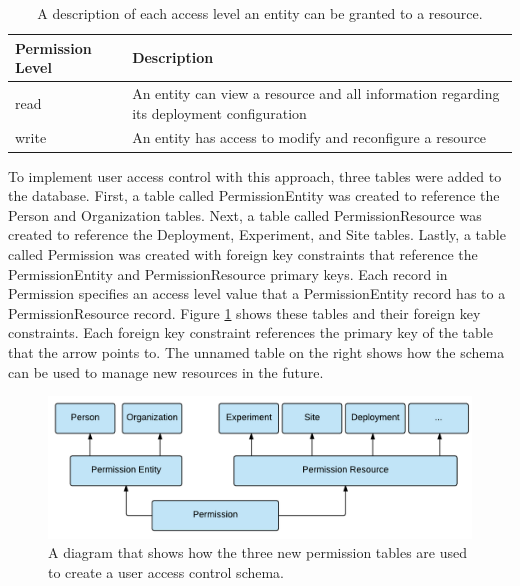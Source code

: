 
\begin{table}[H]
	\centering
	\renewcommand{\arraystretch}{1.1}
	\begin{tabular}{|p{3cm}|p{11cm}|}
	\hline
	Permission Level & Description\\
	\hline
	read & An entity can view a resource and all information regarding its deployment configuration \\
	\hline
	write & An entity has access to  modify and reconfigure a resource\\
	\hline
	\end{tabular}
	\caption{A description of each access level an entity can be granted to a resource.}
	\label{tab:permissions}
\end{table}

To implement user access control with this approach, three tables were added to the database. First, a table called PermissionEntity was created to reference the Person and Organization tables. Next, a table called PermissionResource was created to reference the Deployment, Experiment, and Site tables. Lastly, a table called Permission was created with foreign key constraints that reference the PermissionEntity and PermissionResource primary keys. Each record in Permission specifies an access level value that a PermissionEntity record has to a PermissionResource record. Figure \ref{fig:uac_simplified} shows these tables and their foreign key constraints. Each foreign key constraint references the primary key of the table that the arrow points to. The unnamed table on the right shows how the schema can be used to manage new resources in the future.

\begin{figure}[H]
	\centering
	\includegraphics[width=\textwidth]{figures/uac_simplified.png}
	\caption{A diagram that shows how the three new permission tables are used to create a user access control schema.}
	\label{fig:uac_simplified}
\end{figure}

